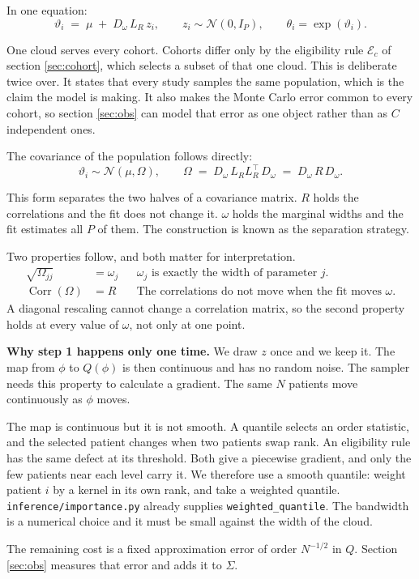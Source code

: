 \documentclass[11pt]{article}
\newcommand{\Ncal}{\mathcal{N}}
\newcommand{\Tr}{^{\!\top}}
\DeclareMathOperator{\Corr}{Corr}
\begin{document}
In one equation:
\begin{equation}
\vartheta_i \;=\; \mu \;+\; D_\omega\,L_R\,z_i,
\qquad z_i\sim\Ncal(0,I_P),
\qquad \theta_i=\exp(\vartheta_i).
\label{eq:patient}
\end{equation}

One cloud serves every cohort. Cohorts differ only by the eligibility rule
$\mathcal{E}_c$ of section \ref{sec:cohort}, which selects a subset of that one
cloud. This is deliberate twice over. It states that every study samples the same
population, which is the claim the model is making. It also makes the Monte Carlo
error common to every cohort, so section \ref{sec:obs} can model that error as one
object rather than as $C$ independent ones.

The covariance of the population follows directly:
\begin{equation}
\vartheta_i\sim\Ncal(\mu,\Omega),
\qquad
\Omega \;=\; D_\omega\,L_R L_R\Tr\,D_\omega \;=\; D_\omega\,R\,D_\omega .
\label{eq:Omega}
\end{equation}

This form separates the two halves of a covariance matrix. $R$ holds the
correlations and the fit does not change it. $\omega$ holds the marginal widths
and the fit estimates all $P$ of them. The construction is known as the
separation strategy.

Two properties follow, and both matter for interpretation.
\begin{align}
\sqrt{\Omega_{jj}} &= \omega_j
  && \text{$\omega_j$ is exactly the width of parameter $j$.}\\
\Corr(\Omega) &= R
  && \text{The correlations do not move when the fit moves $\omega$.}
\end{align}
A diagonal rescaling cannot change a correlation matrix, so the second property
holds at every value of $\omega$, not only at one point.

\begin{notebox}
\textbf{Why step 1 happens only one time.} We draw $z$ once and we keep it. The
map from $\phi$ to $Q(\phi)$ is then continuous and has no random noise. The
sampler needs this property to calculate a gradient. The same $N$ patients move
continuously as $\phi$ moves.

The map is continuous but it is not smooth. A quantile selects an order
statistic, and the selected patient changes when two patients swap rank. An
eligibility rule has the same defect at its threshold. Both give a piecewise
gradient, and only the few patients near each level carry it. We therefore use
a smooth quantile: weight patient $i$ by a kernel in its own rank, and take a
weighted quantile. \texttt{inference/importance.py} already supplies
\texttt{weighted\_quantile}. The bandwidth is a numerical choice and it must be
small against the width of the cloud.

The remaining cost is a fixed approximation error of order $N^{-1/2}$ in $Q$.
Section \ref{sec:obs} measures that error and adds it to $\Sigma$.
\end{notebox}
\end{document}
